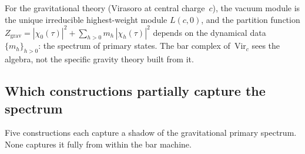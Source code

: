 \documentclass[11pt]{article}
\begin{document}
For the gravitational theory (Virasoro at central charge~$c$),
the vacuum module is the unique irreducible highest-weight module
$L(c,0)$, and the partition function $Z_{\mathrm{grav}}
= |\chi_0(\tau)|^2 + \sum_{h > 0} m_h\,|\chi_h(\tau)|^2$ depends
on the dynamical data $\{m_h\}_{h > 0}$: the spectrum of
primary states.  The bar complex of~$\mathrm{Vir}_c$ sees the
algebra, not the specific gravity theory built from it.

\subsection{Which constructions partially capture the spectrum}

Five constructions each capture a shadow of the gravitational
primary spectrum.  None captures it fully from within the bar
machine.
\end{document}
